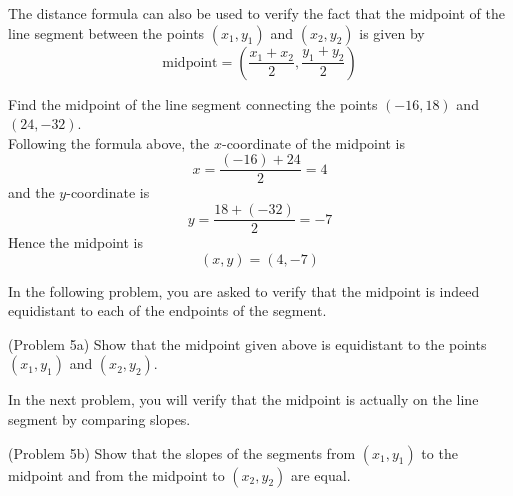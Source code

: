 \documentclass[handout]{ximera}
\begin{document}
The distance formula can also be used to verify the fact that the midpoint of the line segment between the points 
$(x_1,y_1)$ and $(x_2, y_2)$ is given by
\[
\text{midpoint} = \left(\frac{x_1+x_2}{2}, \frac{y_1+y_2}{2}\right)
\]

\begin{example}[Example 5]
Find the midpoint of the line segment connecting the points $(-16,18)$ and $(24,-32)$.\\
Following the formula above, the $x$-coordinate of the midpoint is
\[
x = \frac{ (-16)+24 }{2} = 4
\]
and the $y$-coordinate is
\[
y = \frac{ 18+ (-32)}{2} = -7
\]
Hence the midpoint is
\[
(x,y) = (4,-7)
\]
\end{example}

In the following problem, you are asked to verify that the midpoint is indeed equidistant to each of the endpoints of the segment.

\begin{problem}(Problem 5a)
Show that the midpoint given above is equidistant to the points $(x_1, y_1)$ and $(x_2, y_2)$.
\end{problem}
In the next problem, you will verify that the midpoint is actually on the line segment by comparing slopes.
\begin{problem}(Problem 5b)
Show that the slopes of the segments from $(x_1, y_1)$ to the midpoint and from the midpoint to $(x_2, y_2)$ are equal.
\end{problem}
\end{document}
